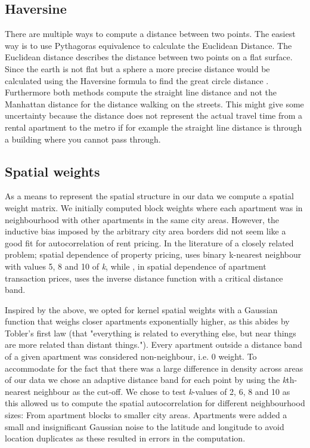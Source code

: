 \documentclass{article}
\begin{document}
\subsection{Haversine} \label{haversine}
There are multiple ways to compute a distance between two points. The easiest way is to use Pythagoras equivalence to calculate the Euclidean Distance. The Euclidean distance describes the distance between two points on a flat surface. Since the earth is not flat but a sphere a more precise distance would be calculated using the Haversine formula to find the great circle distance \cite{Lecture10}. Furthermore both methods compute the straight line distance and not the Manhattan distance for the distance walking on the streets. This might give some uncertainty because the distance does not represent the actual travel time from a rental apartment to the metro if for example the straight line distance is through a building where you cannot pass through. 

\subsection{Spatial weights}
As a means to represent the spatial structure in our data we compute a spatial weight matrix. We initially computed block weights where each apartment was in neighbourhood with other apartments in the same city areas. However, the inductive bias imposed by the arbitrary city area borders did not seem like a good fit for autocorrelation of rent pricing. In the literature of a closely related problem; spatial dependence of property pricing, \cite{ozyurt} uses binary k-nearest neighbour with values 5, 8 and 10 of \textit{k}, while \cite{hyun}, in spatial dependence of apartment transaction prices, uses the inverse distance function with a critical distance band. 

Inspired by the above, we opted for kernel spatial weights with a Gaussian function that weighs closer apartments exponentially higher, as this abides by Tobler's first law (that "everything is related to everything else, but near things are more related than distant things."). Every apartment outside a distance band of a given apartment was considered non-neighbour, i.e. 0 weight. To accommodate for the fact that there was a large difference in density across areas of our data we chose an adaptive distance band for each point by using the \textit{k}th-nearest neighbour as the cut-off. We chose to test \textit{k}-values of 2, 6, 8 and 10 as this allowed us to compute the spatial autocorrelation for different neighbourhood sizes: From apartment blocks to smaller city areas. Apartments were added a small and insignificant Gaussian noise to the latitude and longitude to avoid location duplicates as these resulted in errors in the computation.
\end{document}
